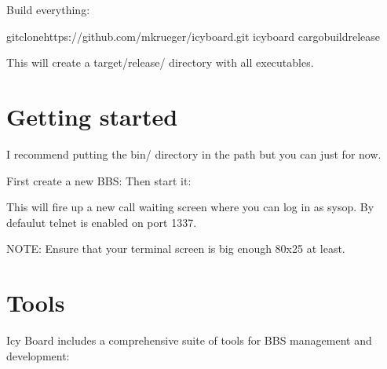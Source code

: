 \documentclass[letterpaper,10pt,english]{sphinxmanual}
\begin{document}
\sphinxAtStartPar
Build everything:

\begin{sphinxVerbatim}[commandchars=\\\{\}]
gitclonehttps://github.com/mkrueger/icy\PYGZus{}board.git
icy\PYGZus{}board
cargobuild\PYGZhy{}\PYGZhy{}release
\end{sphinxVerbatim}

\sphinxAtStartPar
This will create a target/release/ directory with all executables.


\section{Getting started}
\label{\detokenize{index:getting-started}}
\sphinxAtStartPar
I recommend putting the bin/ directory in the path but you can just  for now.

\sphinxAtStartPar
First create a new BBS: 
Then start it: 

\sphinxAtStartPar
This will fire up a new call waiting screen where you can log in as sysop. By defaulut telnet is enabled on port 1337.

\sphinxAtStartPar
NOTE: Ensure that your terminal screen is big enough \sphinxhyphen{} 80x25 at least.


\section{Tools}
\label{\detokenize{index:tools}}
\sphinxAtStartPar
Icy Board includes a comprehensive suite of tools for BBS management and development:
\end{document}
